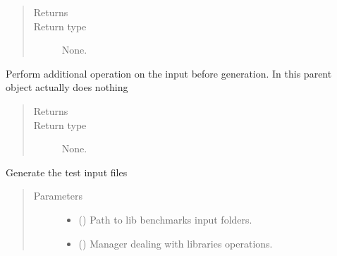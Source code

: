 \documentclass[letterpaper,10pt,english]{sphinxmanual}
\begin{document}
\begin{fulllineitems}
\begin{quote}
\begin{description}
\item[{Returns}] \leavevmode


\item[{Return type}] \leavevmode
None.

\end{description}\end{quote}

\begin{fulllineitems}
\label{\detokenize{api/inputgeneration:testrun.Test.custom_inp_modifications}}
Perform additional operation on the input before generation. In this
parent object actually does nothing
\begin{quote}\begin{description}
\item[{Returns}] \leavevmode


\item[{Return type}] \leavevmode
None.

\end{description}\end{quote}

\end{fulllineitems}


\begin{fulllineitems}
\label{\detokenize{api/inputgeneration:testrun.Test.generate_test}}
Generate the test input files
\begin{quote}\begin{description}
\item[{Parameters}] \leavevmode\begin{itemize}
\item {} 
 () \textendash{} Path to lib benchmarks input folders.

\item {} 
 ({\hyperref[\detokenize{api/initobjects:libmanager.LibManager}]{}}) \textendash{} Manager dealing with libraries operations.


\end{itemize}
\end{description}
\end{quote}
\end{fulllineitems}
\end{fulllineitems}
\end{document}
